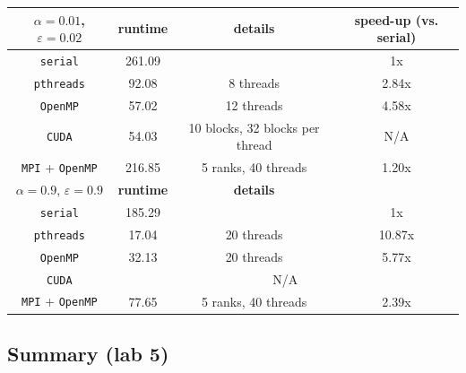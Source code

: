 \documentclass{article}
\begin{document}
\begin{center}
    \begin{tabular}{|c|c|c|c|}
        \cline{2-4}
        \multicolumn{1}{c|}{$\alpha=0.01$, $\varepsilon=0.02$}
            & \textbf{runtime} & \textbf{details} & \textbf{speed-up (vs. serial)} \\
        \cline{2-4}
        \hline
        \texttt{serial}
            & 261.09 & & 1x \\
        \texttt{pthreads}
            & 92.08 & 8 threads & 2.84x \\
        \texttt{OpenMP}
            & 57.02 & 12 threads & 4.58x \\
        \texttt{CUDA}
            & 54.03 & 10 blocks, 32 blocks per thread & N/A \\
        \texttt{MPI} + \texttt{OpenMP}
            & 216.85 & 5 ranks, 40 threads & 1.20x \\
        \hline
        \hline
        \cline{2-4}
        \multicolumn{1}{c|}{$\alpha=0.9$, $\varepsilon=0.9$}
            & \textbf{runtime} & \textbf{details} \\
        \cline{2-4}
        \hline
        \texttt{serial}
            & 185.29 & & 1x \\
        \texttt{pthreads}
            & 17.04 & 20 threads & 10.87x  \\
        \texttt{OpenMP}
            & 32.13 & 20 threads & 5.77x \\
        \cline{2-4}
        \texttt{CUDA}
            & \multicolumn{3}{c|}{N/A} \\
        \cline{2-4}
        \texttt{MPI} + \texttt{OpenMP}
            & 77.65 & 5 ranks, 40 threads & 2.39x \\
        \hline
    \end{tabular}

\end{center}
    
\pagebreak
\vspace*{-6em}
\subsection*{Summary (lab 5)}
\end{document}
